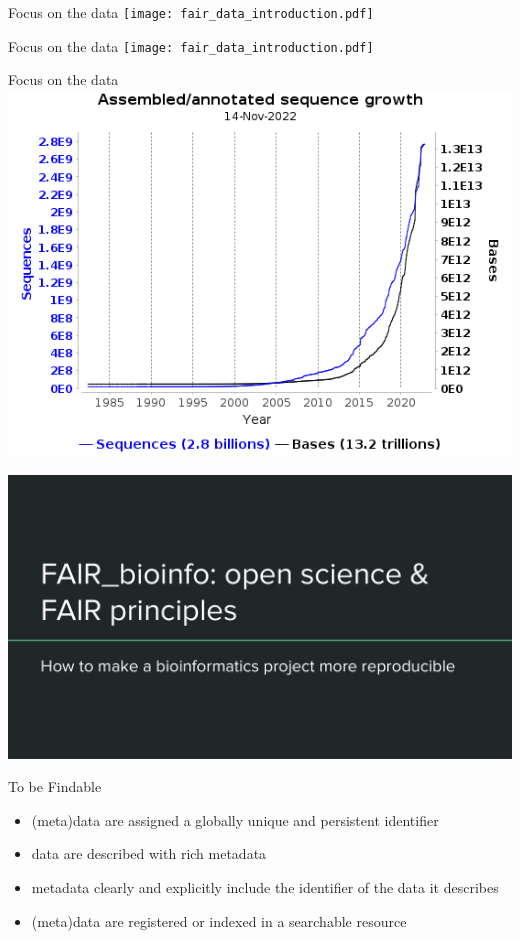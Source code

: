 \begin{frame}{Focus on the data}
\centering\texttt{[image: fair\_data\_introduction.pdf]}
\end{frame}
\begin{frame}{Focus on the data}
\centering\texttt{[image: fair\_data\_introduction.pdf]}
\end{frame}

\begin{frame}{Focus on the data}
\centering\includegraphics[scale=0.55]{images/ena_embl_growth.png}
\end{frame}
\begin{frame}
\includegraphics[page=8,scale=0.55]{01_OS_and_FAIR_intro.pdf}
\end{frame}

\begin{frame}
\begin{block}{To be Findable}
\begin{itemize}
\item (meta)data are assigned a globally unique and persistent identifier
\item data are described with rich metadata
\item metadata clearly and explicitly include the identifier of the data it describes
\item (meta)data are registered or indexed in a searchable resource
\end{itemize}
\end{block}
\end{frame}

